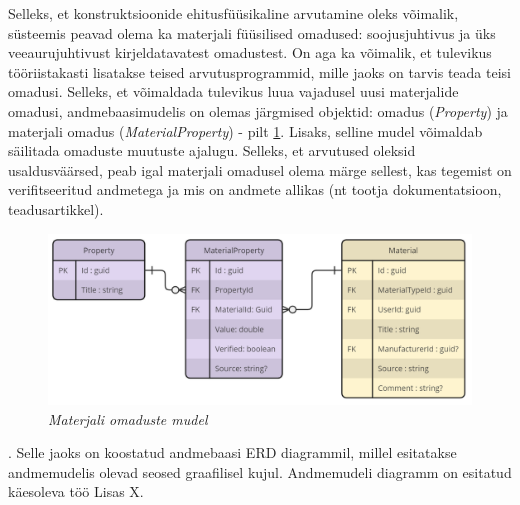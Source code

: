 Selleks, et konstruktsioonide ehitusfüüsikaline arvutamine oleks võimalik, süsteemis peavad olema ka 
materjali füüsilised omadused: soojusjuhtivus ja üks veeaurujuhtivust kirjeldatavatest omadustest. On 
aga ka võimalik, et tulevikus tööriistakasti lisatakse teised arvutusprogrammid, mille jaoks on tarvis teada
teisi omadusi. Selleks, et võimaldada tulevikus luua vajadusel uusi materjalide omadusi, andmebaasimudelis
on olemas järgmised objektid: omadus (\textit{Property}) ja materjali omadus (\textit{MaterialProperty}) - pilt 
\ref{fig:db_properties_model}. Lisaks, selline mudel võimaldab säilitada omaduste muutuste ajalugu.
Selleks, et arvutused oleksid usaldusväärsed, peab igal materjali omadusel olema märge sellest, kas 
tegemist on verifitseeritud andmetega ja mis on andmete allikas (nt tootja dokumentatsioon, teadusartikkel).

\begin{figure}[ht]
    \centering
    \includegraphics[width=.8\textwidth]{figures/analysis/db_desing_2.png}
    \caption[Materjali omaduste mudel]{\textit{Materjali omaduste mudel}}
    \label{fig:db_properties_model}
\end{figure}
.
Selle jaoks on koostatud andmebaasi ERD diagrammil, millel esitatakse andmemudelis olevad seosed graafilisel
kujul. Andmemudeli diagramm on esitatud käesoleva töö Lisas X.

